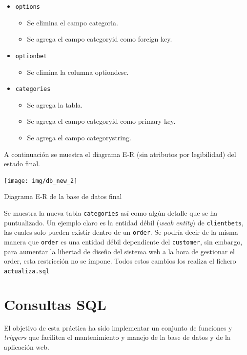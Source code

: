 \documentclass{article}
\begin{document}
\begin{itemize}
\begin{itemize}
        \end{itemize}
    \item\texttt{options}
        \begin{itemize}
            \item Se elimina el campo categoria.
            \item Se agrega el campo categoryid como foreign key.
        \end{itemize}
    \item\texttt{optionbet}
        \begin{itemize}
            \item Se elimina la columna optiondesc.
        \end{itemize}
    \item\texttt{categories}
        \begin{itemize}
            \item Se agrega la tabla.
            \item Se agrega el campo categoryid como primary key.
            \item Se agrega el campo categorystring.
        \end{itemize}
\end{itemize}
\newpage
A continuación se muestra el diagrama E-R (sin atributos por legibilidad) del estado final.
\smallbreak
\begin{minipage}{\linewidth}
    \centering
    \captionsetup{type=figure}
    \texttt{[image: img/db\_new\_2]}
    \caption{Diagrama E-R de la base de datos final}
    \label{fig:fig2}
\end{minipage}
Se muestra la nueva tabla \texttt{categories} así como algún detalle que se ha puntualizado. Un ejemplo claro es la entidad débil (\textit{weak entity}) de \texttt{clientbets}, las cuales solo pueden existir dentro de un \texttt{order}. Se podría decir de la misma manera que \texttt{order} es una entidad débil dependiente del \texttt{customer}, sin embargo, para aumentar la libertad de diseño del sistema web a la hora de gestionar el order, esta restricción no se impone.
Todos estos cambios los realiza el fichero \texttt{actualiza.sql}

\section{Consultas SQL}
El objetivo de esta práctica ha sido implementar un conjunto de funciones y \textit{triggers} que faciliten el mantenimiento y manejo de la base de datos y de la aplicación web.
\end{document}
